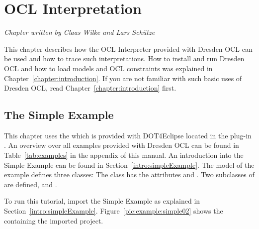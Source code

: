 \chapter{OCL Interpretation}
\label{chapter:interpretation}

\begin{flushright}
\textit{Chapter written by Claas Wilke and Lars Sch\"{u}tze}
\end{flushright}

This chapter describes how the OCL Interpreter provided with Dresden OCL can be
used and how to trace such interpretations. How to install and run Dresden OCL
and how to load models and OCL constraints was explained in
Chapter~\ref{chapter:introduction}. If you are not familiar with such basic
uses of Dresden OCL, read Chapter~\ref{chapter:introduction} first.



\section{The Simple Example}

This chapter uses the  which is provided with 
\acl{DOT4Eclipse} located in the plug-in 
. An overview over
all examples provided with Dresden OCL can be found in 
Table~\ref{tab:examples} in the appendix of this manual. An introduction into
the Simple Example can be found in Section~\ref{intro:simpleExample}. The model 
of the example defines three classes: The class  has the 
attributes  and . Two subclasses of  are 
defined,  and .

To run this tutorial, import the Simple Example as explained in
Section~\ref{intro:simpleExample}. Figure~\ref{pic:example:simple02} shows the
 containing the imported project.

